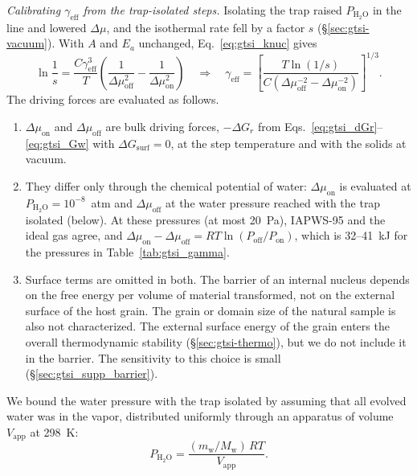 \textit{Calibrating $\gamma_{\mathrm{eff}}$ from the trap-isolated steps.} Isolating the trap
raised $P_{\mathrm{H_2O}}$ in the line and lowered $\Delta\mu$, and the isothermal rate fell by a factor
$s$ (\S\ref{sec:gtsi-vacuum}). With $A$ and $E_a$ unchanged, Eq.~\eqref{eq:gtsi_knuc} gives
\begin{equation}
  \ln\frac{1}{s} = \frac{C\gamma_{\mathrm{eff}}^{3}}{T}\left(\frac{1}{\Delta\mu_{\mathrm{off}}^{2}} - \frac{1}{\Delta\mu_{\mathrm{on}}^{2}}\right)
  \quad\Longrightarrow\quad
  \gamma_{\mathrm{eff}} = \left[\frac{T\ln(1/s)}{C\left(\Delta\mu_{\mathrm{off}}^{-2} - \Delta\mu_{\mathrm{on}}^{-2}\right)}\right]^{1/3}.
  \label{eq:gtsi_gamma_cal}
\end{equation}
The driving forces are evaluated as follows.
\begin{enumerate}
  \item $\Delta\mu_{\mathrm{on}}$ and $\Delta\mu_{\mathrm{off}}$ are bulk driving forces,
  $-\Delta G_r$ from Eqs.~\eqref{eq:gtsi_dGr}--\eqref{eq:gtsi_Gw} with $\Delta G_{\mathrm{surf}} = 0$, at the
  step temperature and with the solids at vacuum.
  \item They differ only through the chemical potential of water: $\Delta\mu_{\mathrm{on}}$ is
  evaluated at $P_{\mathrm{H_2O}} = 10^{-8}$~atm and $\Delta\mu_{\mathrm{off}}$ at the water pressure
  reached with the trap isolated (below). At these pressures (at most 20~Pa), IAPWS-95 and the
  ideal gas agree, and
  $\Delta\mu_{\mathrm{on}} - \Delta\mu_{\mathrm{off}} = RT\ln(P_{\mathrm{off}}/P_{\mathrm{on}})$, which is
  32--41~kJ for the pressures in Table~\ref{tab:gtsi_gamma}.
  \item Surface terms are omitted in both. The barrier of an internal nucleus depends on the free
  energy per volume of material transformed, not on the external surface of the host grain. The
  grain or domain size of the natural sample is also not characterized. The external surface
  energy of the grain enters the overall thermodynamic stability (\S\ref{sec:gtsi-thermo}),
  but we do not include it in the barrier. The sensitivity to this choice is small
  (\S\ref{sec:gtsi_supp_barrier}).
\end{enumerate}
We bound the water pressure with the trap isolated by assuming that all evolved water was in the
vapor, distributed uniformly through an apparatus of volume $V_{\mathrm{app}}$ at 298~K:
\begin{equation}
  P_{\mathrm{H_2O}} = \frac{(m_{\mathrm{w}}/M_{\mathrm{w}})\,RT}{V_{\mathrm{app}}} .
\end{equation}
